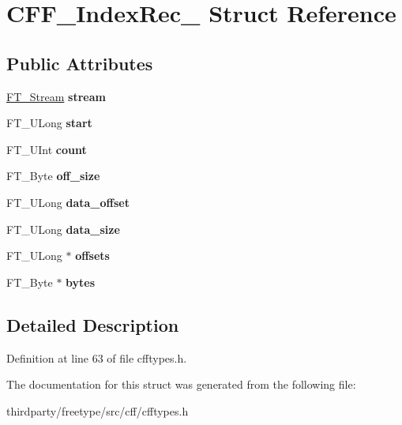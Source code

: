 \hypertarget{struct_c_f_f___index_rec__}{}\section{C\+F\+F\+\_\+\+Index\+Rec\+\_\+ Struct Reference}
\label{struct_c_f_f___index_rec__}
\subsection*{Public Attributes}
\begin{DoxyCompactItemize}
\item 
\mbox{\label{struct_c_f_f___index_rec___ad5ee08e8fada7dea2f9208d3519bcd5d}} 
\hyperlink{struct_f_t___stream_rec__}{F\+T\+\_\+\+Stream} {\bfseries stream}
\item 
\mbox{\label{struct_c_f_f___index_rec___af267c544c3ef35bba1c827e161eb3e60}} 
F\+T\+\_\+\+U\+Long {\bfseries start}
\item 
\mbox{\label{struct_c_f_f___index_rec___a8e261cee0fe88c39f0604f54618aba95}} 
F\+T\+\_\+\+U\+Int {\bfseries count}
\item 
\mbox{\label{struct_c_f_f___index_rec___a4016721ce95696c435e6d1c38ccf7c12}} 
F\+T\+\_\+\+Byte {\bfseries off\+\_\+size}
\item 
\mbox{\label{struct_c_f_f___index_rec___a9e3d683cc91becae1421c8737b8f176b}} 
F\+T\+\_\+\+U\+Long {\bfseries data\+\_\+offset}
\item 
\mbox{\label{struct_c_f_f___index_rec___a71e1cc8ca3c9188e150d22301e055827}} 
F\+T\+\_\+\+U\+Long {\bfseries data\+\_\+size}
\item 
\mbox{\label{struct_c_f_f___index_rec___a7ac9bbce2cfd2625ab78dd8d4c8e6a39}} 
F\+T\+\_\+\+U\+Long $\ast$ {\bfseries offsets}
\item 
\mbox{\label{struct_c_f_f___index_rec___aaa5d7eabfd5c3c2215e85b221e27f5fd}} 
F\+T\+\_\+\+Byte $\ast$ {\bfseries bytes}
\end{DoxyCompactItemize}


\subsection{Detailed Description}


Definition at line 63 of file cfftypes.\+h.



The documentation for this struct was generated from the following file\+:\begin{DoxyCompactItemize}
\item 
thirdparty/freetype/src/cff/cfftypes.\+h\end{DoxyCompactItemize}

